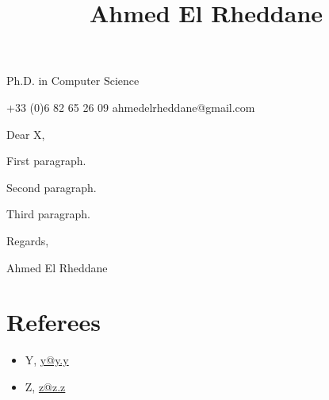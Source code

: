 \documentclass{mycl}
\begin{document}
\title{Ahmed El Rheddane}{Ph.D. in Computer Science}

         {+33 (0)6 82 65 26 09}
         {ahmedelrheddane@gmail.com}

\vspace{\fill}

Dear X,\bigskip\bigskip

First paragraph.\bigskip

Second paragraph.\bigskip

Third paragraph.\bigskip\bigskip

Regards,\bigskip\bigskip

Ahmed El Rheddane

\vspace{\fill}

\section{Referees}
\begin{itemize}
\item Y, \href{mailto:y@y.y}{y@y.y}
\item Z, \href{mailto:z@z.z}{z@z.z}
\end{itemize}
\end{document}
